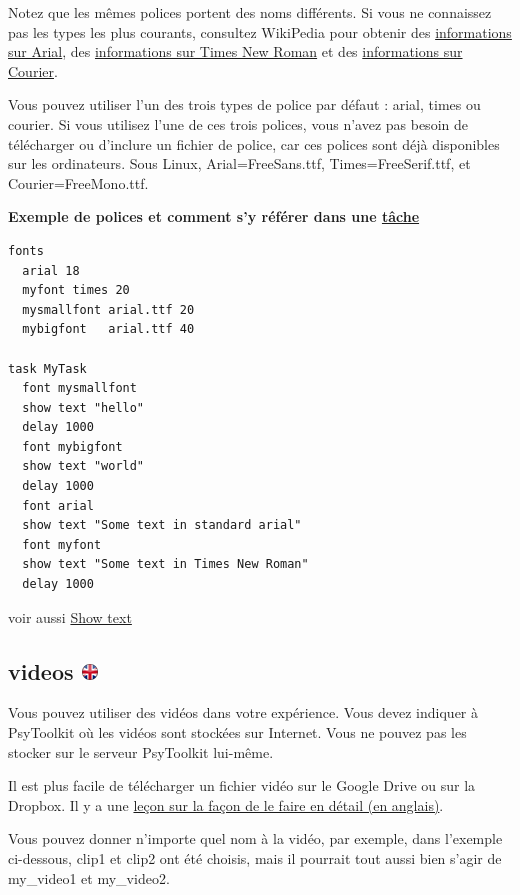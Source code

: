 \documentclass[
]{book}
\begin{document}
Notez que les mêmes polices portent des noms différents. Si vous ne connaissez pas les types les plus courants, consultez WikiPedia pour obtenir des \href{https://en.wikipedia.org/wiki/Arial}{informations sur Arial}, des \href{https://en.wikipedia.org/wiki/Times_New_Roman}{informations sur Times New Roman} et des \href{https://en.wikipedia.org/wiki/Courier_\%28typeface\%29}{informations sur Courier}.

Vous pouvez utiliser l'un des trois types de police par défaut : arial, times ou courier. Si vous utilisez l'une de ces trois polices, vous n'avez pas besoin de télécharger ou d'inclure un fichier de police, car ces polices sont déjà disponibles sur les ordinateurs. Sous Linux, Arial=FreeSans.ttf, Times=FreeSerif.ttf, et Courier=FreeMono.ttf.

\textbf{Exemple de polices et comment s'y référer dans une \protect\hyperlink{task}{tâche}}

\begin{verbatim}
fonts
  arial 18
  myfont times 20
  mysmallfont arial.ttf 20
  mybigfont   arial.ttf 40

task MyTask
  font mysmallfont
  show text "hello"
  delay 1000
  font mybigfont
  show text "world"
  delay 1000
  font arial
  show text "Some text in standard arial"
  font myfont
  show text "Some text in Times New Roman"
  delay 1000
\end{verbatim}

voir aussi \protect\hyperlink{task-show-text}{Show text}

\hypertarget{videos}{%
\subsection[videos ]{\texorpdfstring{videos \href{https://www.psytoolkit.org/doc3.4.0/syntax.html\#videos}{\protect\includegraphics{img/ukflag.png}}}{videos }}\label{videos}}

Vous pouvez utiliser des vidéos dans votre expérience. Vous devez indiquer à PsyToolkit où les vidéos sont stockées sur Internet. Vous ne pouvez pas les stocker sur le serveur PsyToolkit lui-même.

Il est plus facile de télécharger un fichier vidéo sur le Google Drive ou sur la Dropbox. Il y a une \href{https://www.psytoolkit.org/lessons/video.html}{leçon sur la façon de le faire en détail (en anglais)}.

Vous pouvez donner n'importe quel nom à la vidéo, par exemple, dans l'exemple ci-dessous, clip1 et clip2 ont été choisis, mais il pourrait tout aussi bien s'agir de my\_video1 et my\_video2.
\end{document}
